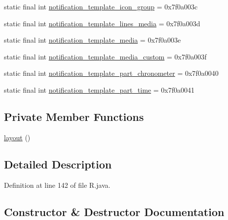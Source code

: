 \begin{DoxyCompactItemize}
\item 
static final int \mbox{\hyperlink{classcom_1_1jjoe64_1_1graphview_1_1_r_1_1layout_ae2d3fc853cf33c9b20d1ea94e4e157e4}{notification\+\_\+template\+\_\+icon\+\_\+group}} = 0x7f0a003c
\item 
static final int \mbox{\hyperlink{classcom_1_1jjoe64_1_1graphview_1_1_r_1_1layout_af17a4278b49237e76bcda04523825c8e}{notification\+\_\+template\+\_\+lines\+\_\+media}} = 0x7f0a003d
\item 
static final int \mbox{\hyperlink{classcom_1_1jjoe64_1_1graphview_1_1_r_1_1layout_a6ca88063ea0500c2a07c5f9f8ac38f60}{notification\+\_\+template\+\_\+media}} = 0x7f0a003e
\item 
static final int \mbox{\hyperlink{classcom_1_1jjoe64_1_1graphview_1_1_r_1_1layout_ac4d8f25f8f200ec395d4ab70fc6fb480}{notification\+\_\+template\+\_\+media\+\_\+custom}} = 0x7f0a003f
\item 
static final int \mbox{\hyperlink{classcom_1_1jjoe64_1_1graphview_1_1_r_1_1layout_a2a447a9160e3e780cf7d16d90b89c3a1}{notification\+\_\+template\+\_\+part\+\_\+chronometer}} = 0x7f0a0040
\item 
static final int \mbox{\hyperlink{classcom_1_1jjoe64_1_1graphview_1_1_r_1_1layout_a1c660f2e11ff1a857164365cd2858868}{notification\+\_\+template\+\_\+part\+\_\+time}} = 0x7f0a0041
\end{DoxyCompactItemize}
\subsection*{Private Member Functions}
\begin{DoxyCompactItemize}
\item 
\mbox{\hyperlink{classcom_1_1jjoe64_1_1graphview_1_1_r_1_1layout_a0ae6e06d666cc8adceb182adda9b41e5}{layout}} ()
\end{DoxyCompactItemize}


\subsection{Detailed Description}


Definition at line 142 of file R.\+java.



\subsection{Constructor \& Destructor Documentation}
\mbox{\label{classcom_1_1jjoe64_1_1graphview_1_1_r_1_1layout_a0ae6e06d666cc8adceb182adda9b41e5}} 
